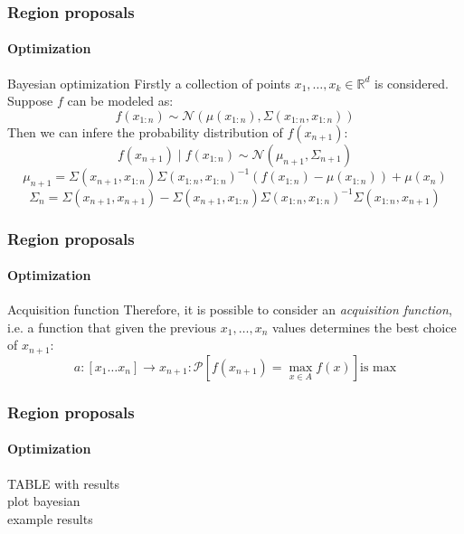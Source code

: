 \begin{frame}
    \frametitle{Region proposals}
    \framesubtitle{Optimization}
    \vskip -0.5cm
    \begin{block}{Bayesian optimization}
        Firstly a collection of points $x_1, \ldots, x_k \in \mathbb{R}^d$ is considered. Suppose $f$ can be modeled as:
        \begin{equation*}
            f\left(x_{1:n}\right) \sim \mathcal{N}\left(\mu\left(x_{1:n}\right), \Sigma\left(x_{1:n}, x_{1:n}\right)\right)
        \end{equation*}
        Then we can infere the probability distribution of $f\left(x_{n+1}\right)$:
        \begin{equation}
            f\left(x_{n+1}\right) \mid f\left(x_{1:n}\right) \sim \mathcal{N}\left(\mu_{n+1}, \Sigma_{n+1}\right)
        \end{equation}
        \begin{equation*}
            \mu_{n+1} = \Sigma\left(x_{n+1}, x_{1:n}\right)\Sigma\left(x_{1:n}, x_{1:n}\right)^{-1}\left(f\left(x_{1:n}\right) - \mu\left(x_{1:n}\right)\right) + \mu\left(x_{n}\right)
        \end{equation*}
        \begin{equation*}
            \Sigma_n = \Sigma\left(x_{n+1}, x_{n+1}\right) - \Sigma\left(x_{n+1}, x_{1:n}\right)\Sigma\left(x_{1:n}, x_{1:n}\right)^{-1}\Sigma\left(x_{1:n}, x_{n+1}\right)
        \end{equation*}
    \end{block}
\end{frame}

\begin{frame}
    \frametitle{Region proposals}
    \framesubtitle{Optimization}
    \begin{exampleblock}{Acquisition function}
        Therefore, it is possible to consider an \emph{acquisition function}, i.e. a function that given the previous $x_1, \ldots, x_n$ values determines the best choice of $x_{n+1}$:
        \begin{equation}
            a \colon \left[x_1 \ldots x_n\right] \rightarrow x_{n+1} \colon \mathcal{P}\left[f(x_{n+1}) = \max\limits_{x \in A} f\left(x\right)\right] \text{is max}
        \end{equation}
    \end{exampleblock}
\end{frame}

\begin{frame}
    \frametitle{Region proposals}
    \framesubtitle{Optimization}
    TABLE with results\\
    plot bayesian \\
    example results
\end{frame}


